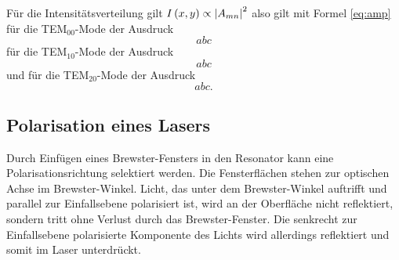 Für die Intensitätsverteilung gilt $I\left(x,y\right) \propto \absolutevalue{A_{mn}}^2$ also gilt mit Formel \eqref{eq:amp} für die 
TEM$_{00}$-Mode der Ausdruck 
\begin{equation}
    abc 
    \label{eqn:mode0}
\end{equation}
für die 
TEM$_{10}$-Mode der Ausdruck 
\begin{equation}
    abc 
    \label{eqn:mode1}
\end{equation}
und für die 
TEM$_{20}$-Mode der Ausdruck 
\begin{equation}
    abc .
    \label{eqn:mode2}
\end{equation}










\subsection{Polarisation eines Lasers}
Durch Einfügen eines Brewster-Fensters in den Resonator kann eine Polarisationsrichtung selektiert werden.
Die Fensterflächen stehen  zur optischen Achse im Brewster-Winkel. Licht, das unter dem Brewster-Winkel auftrifft und parallel zur Einfallsebene polarisiert ist, wird an der Oberfläche nicht reflektiert, sondern tritt ohne Verlust durch das Brewster-Fenster. Die senkrecht zur Einfallsebene polarisierte Komponente des Lichts wird allerdings reflektiert und somit im Laser unterdrückt.

